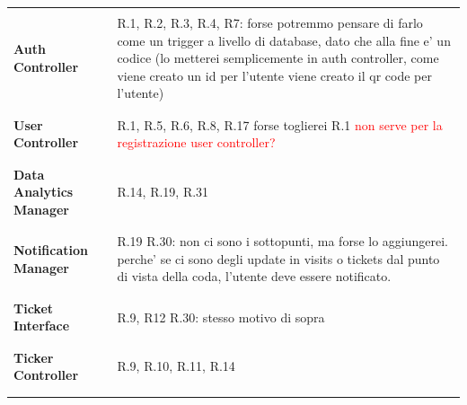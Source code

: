 \documentclass[a4paper, 12pt, oneside, table]{article}
\newcommand*{\lorenzo}[1]{\textcolor{BurntOrange}{#1}}
\newcommand{\yasmin}[1]{\textcolor{Red}{#1}}
\begin{document}
\begin{tabularx}{\linewidth}{| g || l |}
	\hline
	\rule{0pt}{15pt}& \\
	\large{\textbf{Auth Controller}} &  R.1, R.2, R.3, R.4\lorenzo{, R7: forse potremmo pensare di farlo come un trigger a livello di database, dato che alla fine e' un codice (lo metterei semplicemente in auth controller, come viene creato un id per l'utente viene creato il qr code per l'utente)}\\
    & \\
	\hline
	\rule{0pt}{15pt}& \\
	\large{\textbf{User Controller}} &  R.1, R.5, R.6, R.8, R.17 \lorenzo{forse toglierei R.1} \yasmin{non serve per la registrazione user controller?}\\
    & \\
	\hline
	\rule{0pt}{15pt}& \\
	\large{\textbf{Data Analytics Manager}} &  R.14, R.19, R.31\\
    & \\
	\hline
	 \rule{0pt}{15pt}& \\
	\large{\textbf{Notification Manager}} &  R.19 \lorenzo{R.30: non ci sono i sottopunti, ma forse lo aggiungerei. perche' se ci sono degli update in visits o tickets dal punto di vista della coda, l'utente deve essere notificato.}\\
    & \\
	\hline
	\rule{0pt}{15pt}& \\
	\large{\textbf{Ticket Interface}} &  R.9, R12 \lorenzo{R.30: stesso motivo di sopra}\\
    & \\
	\hline
	\rule{0pt}{15pt}& \\
	\large{\textbf{Ticker Controller}} &  R.9, R.10\lorenzo{, R.11, R.14}\\
    & \\
	\hline
	\rule{0pt}{15pt}& \\

\end{tabularx}
\end{document}
